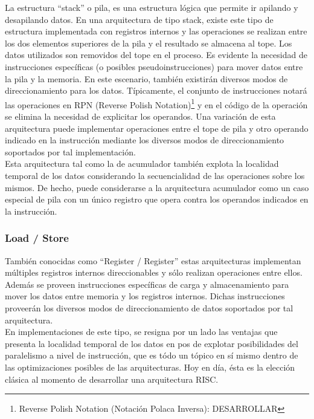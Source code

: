 La estructura ``stack'' o pila, es una estructura lógica que permite ir 
apilando y desapilando datos. En una arquitectura de tipo stack, existe este 
tipo de estructura implementada con registros internos y las operaciones se 
realizan entre los dos elementos superiores de la pila y el resultado se 
almacena al tope. Los datos utilizados son removidos del tope en el proceso. Es 
evidente la necesidad de instrucciones específicas (o posibles 
pseudoinstrucciones) para mover datos entre la pila y la memoria. En este 
escenario, también existirán diversos modos de direccionamiento para los datos. 
Típicamente, el conjunto de instrucciones notará las operaciones en RPN (Reverse 
Polish Notation)\footnote{Reverse Polish Notation (Notación Polaca Inversa): 
DESARROLLAR} y en el código de la operación se elimina la necesidad de 
explicitar los operandos. Una variación de esta arquitectura puede implementar 
operaciones entre el tope de pila y otro operando indicado en la instrucción 
mediante los diversos modos de direccionamiento soportados por tal 
implementación.\\
Esta arquitectura tal como la de acumulador también explota la localidad 
temporal de los datos considerando la secuencialidad de las operaciones sobre 
los mismos. De hecho, puede considerarse a la arquitectura acumulador como un 
caso especial de pila con un único registro que opera contra los operandos 
indicados en la instrucción.

\subsubsection{Load / Store}
\label{subsubsec:theory-modern-data_managment-load_store}

También conocidas como ``Register / Register'' estas arquitecturas 
implementan múltiples registros internos direccionables y sólo realizan 
operaciones entre ellos. Además se proveen instrucciones específicas de carga y 
almacenamiento para mover los datos entre memoria y los registros internos. 
Dichas instrucciones proveerán los diversos modos de direccionamiento de datos 
soportados por tal arquitectura.\\
En implementaciones de este tipo, se resigna por un lado las ventajas que 
presenta la localidad temporal de los datos en pos de explotar posibilidades 
del paralelismo a nivel de instrucción, que es tódo un tópico en sí mismo 
dentro de las optimizaciones posibles de las arquitecturas. Hoy en día, ésta es 
la elección clásica al momento de desarrollar una arquitectura RISC.

